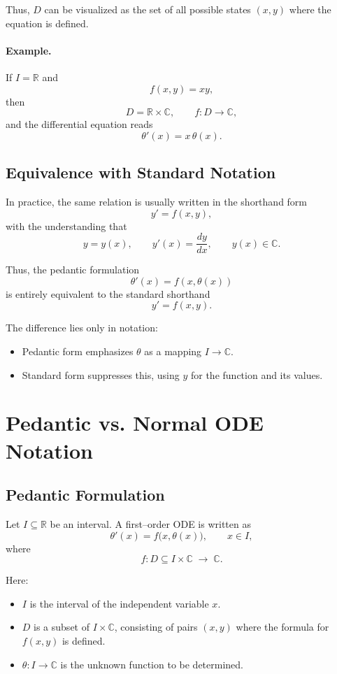 \documentclass[11pt,a4paper]{article}
\begin{document}
	Thus, $D$ can be visualized as the set of all possible states $(x,y)$ where the equation is defined.
	
	\paragraph{Example.}  
	If $I = \mathbb{R}$ and
	$$
	f(x,y) = xy,
	$$
	then
	$$
	D = \mathbb{R} \times \mathbb{C}, \qquad f : D \to \mathbb{C},
	$$
	and the differential equation reads
	$$
	\theta'(x) = x \, \theta(x).
	$$
	
	\subsection*{Equivalence with Standard Notation}
	
	In practice, the same relation is usually written in the shorthand form
	$$
	y' = f(x,y),
	$$
	with the understanding that
	$$
	y = y(x), \qquad y'(x) = \frac{dy}{dx}, \qquad y(x) \in \mathbb{C}.
	$$
	
	Thus, the pedantic formulation
	$$
	\theta'(x) = f(x,\theta(x))
	$$
	is entirely equivalent to the standard shorthand
	$$
	y' = f(x,y).
	$$
	
	The difference lies only in notation:
	\begin{itemize}
		\item Pedantic form emphasizes $\theta$ as a mapping $I \to \mathbb{C}$.
		\item Standard form suppresses this, using $y$ for the function and its values.
	\end{itemize}
	
	\section*{Pedantic vs. Normal ODE Notation}
	
	\subsection*{Pedantic Formulation}
	
	Let $I \subseteq \mathbb{R}$ be an interval.  
	A first--order ODE is written as
	$$
	\theta'(x) = f\bigl(x,\theta(x)\bigr), \qquad x \in I,
	$$
	where
	$$
	f : D \subseteq I \times \mathbb{C} \;\longrightarrow\; \mathbb{C}.
	$$
	
	Here:
	\begin{itemize}
		\item $I$ is the interval of the independent variable $x$.
		\item $D$ is a subset of $I \times \mathbb{C}$, consisting of pairs $(x,y)$ where the formula for $f(x,y)$ is defined.
		\item $\theta : I \to \mathbb{C}$ is the unknown function to be determined.
	\end{itemize}
	
\end{document}
